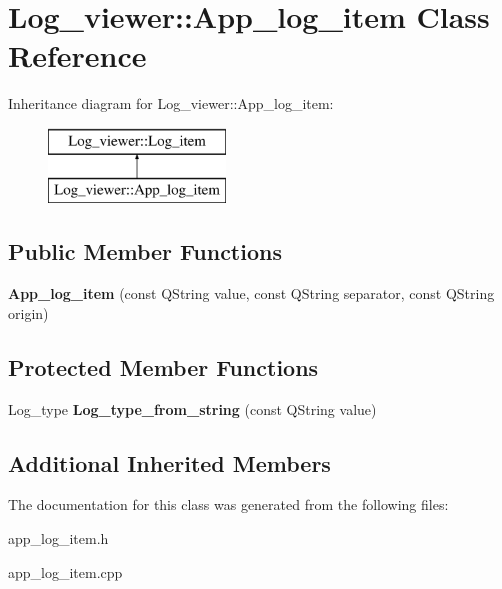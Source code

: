 \hypertarget{class_log__viewer_1_1_app__log__item}{\section{Log\-\_\-viewer\-:\-:App\-\_\-log\-\_\-item Class Reference}
\label{class_log__viewer_1_1_app__log__item}
}
Inheritance diagram for Log\-\_\-viewer\-:\-:App\-\_\-log\-\_\-item\-:\begin{figure}[H]
\begin{center}
\leavevmode
\includegraphics[height=2.000000cm]{class_log__viewer_1_1_app__log__item}
\end{center}
\end{figure}
\subsection*{Public Member Functions}
\begin{DoxyCompactItemize}
\item 
\hypertarget{class_log__viewer_1_1_app__log__item_afb5eeaf3f20fbaa8eb959f956c99f946}{{\bfseries App\-\_\-log\-\_\-item} (const Q\-String value, const Q\-String separator, const Q\-String origin)}\label{class_log__viewer_1_1_app__log__item_afb5eeaf3f20fbaa8eb959f956c99f946}

\end{DoxyCompactItemize}
\subsection*{Protected Member Functions}
\begin{DoxyCompactItemize}
\item 
\hypertarget{class_log__viewer_1_1_app__log__item_ace8a51aab56a113d1b7ffcb093bc7ec7}{Log\-\_\-type {\bfseries Log\-\_\-type\-\_\-from\-\_\-string} (const Q\-String value)}\label{class_log__viewer_1_1_app__log__item_ace8a51aab56a113d1b7ffcb093bc7ec7}

\end{DoxyCompactItemize}
\subsection*{Additional Inherited Members}


The documentation for this class was generated from the following files\-:\begin{DoxyCompactItemize}
\item 
app\-\_\-log\-\_\-item.\-h\item 
app\-\_\-log\-\_\-item.\-cpp\end{DoxyCompactItemize}
